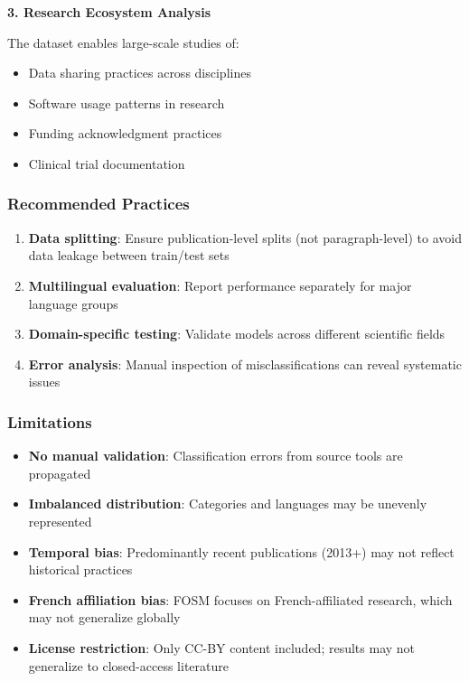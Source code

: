 \documentclass[
]{article}
\providecommand{\tightlist}{%
  \setlength{\itemsep}{0pt}\setlength{\parskip}{0pt}}
\begin{document}
\textbf{3. Research Ecosystem Analysis}

The dataset enables large-scale studies of:

\begin{itemize}
\tightlist
\item
  Data sharing practices across disciplines
\item
  Software usage patterns in research
\item
  Funding acknowledgment practices
\item
  Clinical trial documentation
\end{itemize}

\hypertarget{recommended-practices}{%
\subsubsection{Recommended Practices}\label{recommended-practices}}

\begin{enumerate}
\def\labelenumi{\arabic{enumi}.}
\tightlist
\item
  \textbf{Data splitting}: Ensure publication-level splits (not
  paragraph-level) to avoid data leakage between train/test sets
\item
  \textbf{Multilingual evaluation}: Report performance separately for
  major language groups
\item
  \textbf{Domain-specific testing}: Validate models across different
  scientific fields
\item
  \textbf{Error analysis}: Manual inspection of misclassifications can
  reveal systematic issues
\end{enumerate}

\hypertarget{limitations}{%
\subsubsection{Limitations}\label{limitations}}

\begin{itemize}
\tightlist
\item
  \textbf{No manual validation}: Classification errors from source tools
  are propagated
\item
  \textbf{Imbalanced distribution}: Categories and languages may be
  unevenly represented
\item
  \textbf{Temporal bias}: Predominantly recent publications (2013+) may
  not reflect historical practices
\item
  \textbf{French affiliation bias}: FOSM focuses on French-affiliated
  research, which may not generalize globally
\item
  \textbf{License restriction}: Only CC-BY content included; results may
  not generalize to closed-access literature
\end{itemize}
\end{document}
